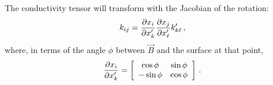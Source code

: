 \documentclass[main.tex]{subfiles}
\begin{document}
The conductivity tensor will transform with the Jacobian of the rotation: 
%
\begin{align}
k_{ij} = \pdv{x_i}{x'_k} \pdv{x_j}{x'_\ell} k'_{k \ell}
\,,
\end{align}
%
where, in terms of the angle \(\phi \) between \(\vec{B}\) and the surface at that point,
%
\begin{align}
\pdv{x_i}{x'_k} = \left[\begin{array}{cc}
\cos \phi  & \sin \phi  \\ 
- \sin \phi & \cos \phi 
\end{array}\right]
\,.
\end{align}

\end{document}
